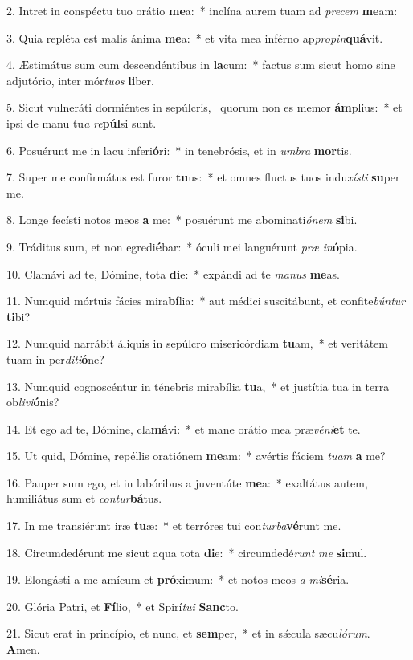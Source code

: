 2. Intret in conspéctu tuo orátio \textbf{me}a:~*  inclína aurem tuam ad \textit{pre}\textit{cem} \textbf{me}am:\

3. Quia repléta est malis ánima \textbf{me}a:~*  et vita mea inférno ap\textit{pro}\textit{pin}\textbf{quá}vit.\

4. Æstimátus sum cum descendéntibus in \textbf{la}cum:~*  factus sum sicut homo sine adjutório, inter mór\textit{tu}\textit{os} \textbf{li}ber.\

5. Sicut vulneráti dormiéntes in sepúlcris, \dag\  quorum non es memor \textbf{ám}plius:~*  et ipsi de manu tu\textit{a} \textit{re}\textbf{púl}si sunt.\

6. Posuérunt me in lacu inferi\textbf{ó}ri:~*  in tenebrósis, et in \textit{um}\textit{bra} \textbf{mor}tis.\

7. Super me confirmátus est furor \textbf{tu}us:~*  et omnes fluctus tuos indu\textit{xís}\textit{ti} \textbf{su}per me.\

8. Longe fecísti notos meos \textbf{a} me:~*  posuérunt me abominati\textit{ó}\textit{nem} \textbf{si}bi.\

9. Tráditus sum, et non egredi\textbf{é}bar:~*  óculi mei languérunt \textit{præ} \textit{in}\textbf{ó}pia.\

10. Clamávi ad te, Dómine, tota \textbf{di}e:~*  expándi ad te \textit{ma}\textit{nus} \textbf{me}as.\

11. Numquid mórtuis fácies mira\textbf{bí}lia:~*  aut médici suscitábunt, et confite\textit{bún}\textit{tur} \textbf{ti}bi?\

12. Numquid narrábit áliquis in sepúlcro misericórdiam \textbf{tu}am,~*  et veritátem tuam in per\textit{di}\textit{ti}\textbf{ó}ne?\

13. Numquid cognoscéntur in ténebris mirabília \textbf{tu}a,~*  et justítia tua in terra ob\textit{li}\textit{vi}\textbf{ó}nis?\

14. Et ego ad te, Dómine, cla\textbf{má}vi:~*  et mane orátio mea præ\textit{vé}\textit{ni}\textbf{et} te.\

15. Ut quid, Dómine, repéllis oratiónem \textbf{me}am:~*  avértis fáciem \textit{tu}\textit{am} \textbf{a} me?\

16. Pauper sum ego, et in labóribus a juventúte \textbf{me}a:~*  exaltátus autem, humiliátus sum et \textit{con}\textit{tur}\textbf{bá}tus.\

17. In me transiérunt iræ \textbf{tu}æ:~*  et terróres tui con\textit{tur}\textit{ba}\textbf{vé}runt me.\

18. Circumdedérunt me sicut aqua tota \textbf{di}e:~*  circumdedé\textit{runt} \textit{me} \textbf{si}mul.\

19. Elongásti a me amícum et \textbf{pró}ximum:~*  et notos meos \textit{a} \textit{mi}\textbf{sé}ria.\

20. Glória Patri, et \textbf{Fí}lio,~*  et Spirí\textit{tu}\textit{i} \textbf{Sanc}to.\

21. Sicut erat in princípio, et nunc, et \textbf{sem}per,~*  et in sǽcula sæcu\textit{ló}\textit{rum}. \textbf{A}men.\

